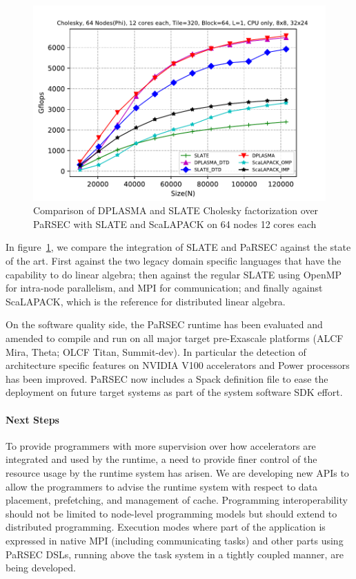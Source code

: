 \begin{figure}
  \vspace*{-1em}\centering\includegraphics[scale=0.55]{projects/2.3.1-PMR/2.3.1.09-ParSEC/SLATE_inital_result_phicluster_scalapack.pdf}
  \caption{Comparison of DPLASMA and SLATE Cholesky factorization over PaRSEC with
           SLATE and ScaLAPACK on 64 nodes 12 cores each\label{fig:slate-parsec}}
\end{figure}
%
In figure~\ref{fig:slate-parsec}, we compare the integration of SLATE
and PaRSEC against the state of the art. First against the two legacy
domain specific languages that have the capability to do linear
algebra; then against the regular SLATE using OpenMP for intra-node
parallelism, and MPI for communication; and finally against ScaLAPACK,
which is the reference for distributed linear algebra.

On the software quality side, the PaRSEC runtime has been evaluated and amended
to compile and run on all major target pre-Exascale platforms (ALCF Mira, Theta; OLCF
Titan, Summit-dev). In particular the detection of architecture specific
features on NVIDIA V100 accelerators and Power processors has been improved.
PaRSEC now includes a Spack definition file to ease the deployment on future
target systems as part of the system software SDK effort.

\paragraph{Next Steps}
To provide programmers with more supervision over how accelerators are
integrated and used by the runtime, a need to provide finer control of the
resource usage by the runtime system has arisen. We are developing new APIs to
allow the programmers to advise the runtime system with respect to data
placement, prefetching, and management of cache.
%
Programming interoperability should not be limited to node-level programming
models but should extend to distributed programming. Execution modes where part
of the application is expressed in native MPI (including communicating tasks)
and other parts using PaRSEC DSLs, running above the task system in a tightly
coupled manner, are being developed.


